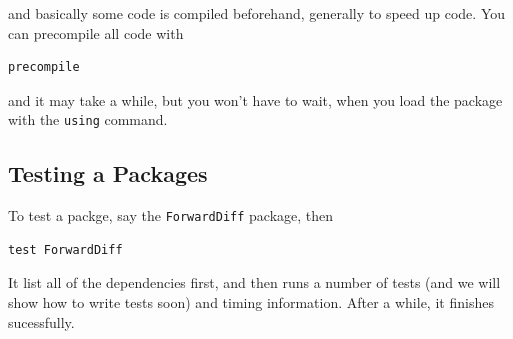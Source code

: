 and basically some code is compiled beforehand, generally to speed up
code. You can precompile all code with

\begin{verbatim}
precompile
\end{verbatim}

and it may take a while, but you won't have to wait, when you load the
package with the \texttt{using} command.

\hypertarget{testing-a-packages}{%
\subsection{Testing a Packages}\label{testing-a-packages}}

To test a packge, say the \texttt{ForwardDiff} package, then

\begin{verbatim}
test ForwardDiff
\end{verbatim}

It list all of the dependencies first, and then runs a number of tests
(and we will show how to write tests soon) and timing information. After
a while, it finishes sucessfully.
